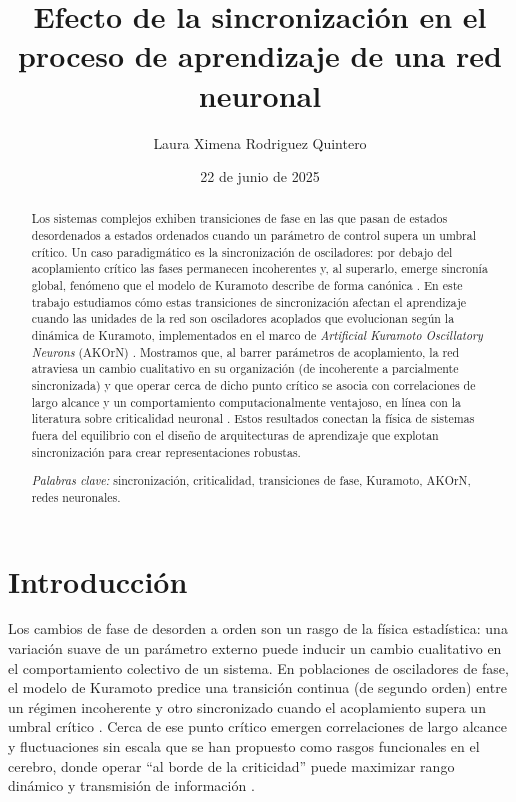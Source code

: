 \documentclass[12pt]{article}
\title{Efecto de la sincronización en el proceso de aprendizaje de una red neuronal}
\author{Laura Ximena Rodriguez Quintero}
\date{22 de junio de 2025}
\begin{document}
\maketitle

\begin{abstract}
Los sistemas complejos exhiben transiciones de fase en las que pasan de estados desordenados a estados ordenados cuando un parámetro de control supera un umbral crítico. Un caso paradigmático es la sincronización de osciladores: por debajo del acoplamiento crítico las fases permanecen incoherentes y, al superarlo, emerge sincronía global, fenómeno que el modelo de Kuramoto describe de forma canónica \cite{Kuramoto1984,Strogatz2000}. En este trabajo estudiamos cómo estas transiciones de sincronización afectan el aprendizaje cuando las unidades de la red son osciladores acoplados que evolucionan según la dinámica de Kuramoto, implementados en el marco de \textit{Artificial Kuramoto Oscillatory Neurons} (AKOrN) \cite{Miyato2024}. Mostramos que, al barrer parámetros de acoplamiento, la red atraviesa un cambio cualitativo en su organización (de incoherente a parcialmente sincronizada) y que operar cerca de dicho punto crítico se asocia con correlaciones de largo alcance y un comportamiento computacionalmente ventajoso, en línea con la literatura sobre criticalidad neuronal \cite{Breakspear2010,ShewPlenz2013,Myrov2024}. Estos resultados conectan la física de sistemas fuera del equilibrio con el diseño de arquitecturas de aprendizaje que explotan sincronización para crear representaciones robustas.

\textit{Palabras clave:} sincronización, criticalidad, transiciones de fase, Kuramoto, AKOrN, redes neuronales.
\end{abstract}

\section{Introducción}

Los cambios de fase de desorden a orden son un rasgo de la física estadística: una variación suave de un parámetro externo puede inducir un cambio cualitativo en el comportamiento colectivo de un sistema. En poblaciones de osciladores de fase, el modelo de Kuramoto predice una transición continua (de segundo orden) entre un régimen incoherente y otro sincronizado cuando el acoplamiento supera un umbral crítico \cite{Kuramoto1984,Strogatz2000}. Cerca de ese punto crítico emergen correlaciones de largo alcance y fluctuaciones sin escala que se han propuesto como rasgos funcionales en el cerebro, donde operar “al borde de la criticidad” puede maximizar rango dinámico y transmisión de información \cite{ShewPlenz2013}.
\end{document}
